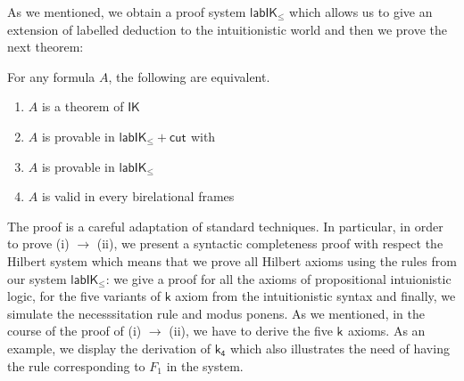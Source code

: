 \documentclass[twoside]{aiml18}
\newcommand{\todo}[1]{{\color{red}[TODO: #1]}}
\newcommand{\B}{\mathcal{B}}
\newcommand*{\ax}[1]{\mathsf{#1}}
\newcommand*{\kax}[1][]		{\ax{k_{#1}}}
\newcommand*{\lab}{\mathsf{lab}}
\newcommand*{\IK}{\mathsf{IK}}
\newcommand*{\labIKp}{\lab\IK_{\le}}
\newcommand*{\labels}[2]{{\color{blue}{#1}\:\colon}{#2}}
\newcommand{\SEQ}{\Rightarrow}
\newcommand*{\rn}[1]  {\ensuremath{\mathsf{#1}}}
\newcommand*{\labrn}[2][]  {\rn{#2}_{#1}}%
\begin{document}
As we mentioned, we obtain a proof system $\labIKp$ which allows us to give an extension of labelled deduction to the intuitionistic world and then we prove the next theorem:

%
%


\begin{theorem}\label{thm:cutfree-compl}
	For any formula $A$, the following are equivalent.
	\begin{enumerate}
		\item\label{i} $A$ is a theorem of $\IK$ 
		\item\label{ii} $A$ is provable in $\labIKp +\labrn{cut}$ with %
%		
		\smash{%
			\scalebox{.9}{$\vliinf{\labrn{cut}}{}{\B_1, \B_2, \Left \SEQ \Right}{\B_1, \Left \SEQ \Right, \labels{z}{C}}{\B_2, \Left, \labels{z}{C} \SEQ \Right}$}
		}%
		\item\label{iii} $A$ is provable in $\labIKp$
		\item\label{iv} $A$ is valid in every birelational frames %
	\end{enumerate}
\end{theorem}

%
%
%
%
%

The proof is a careful adaptation of standard techniques.
%
In particular, in order to prove (i) $\rightarrow$ (ii), we present a syntactic completeness proof with respect the Hilbert system which means that we prove all Hilbert axioms using the rules from our system $\labIKp$: we give a proof for all the axioms of propositional intuionistic logic, for the five variants of $\mathsf{k}$ axiom from the intuitionistic syntax and finally, we simulate the necesssitation rule and modus ponens. As we mentioned, in the course of the proof of (i) $\rightarrow$ (ii), we have to derive the five $\kax$ axioms. 
%
As an example, we display the derivation of $\kax[4]$ which also illustrates the need of having the rule corresponding to $F_1$ in the system.
\end{document}

